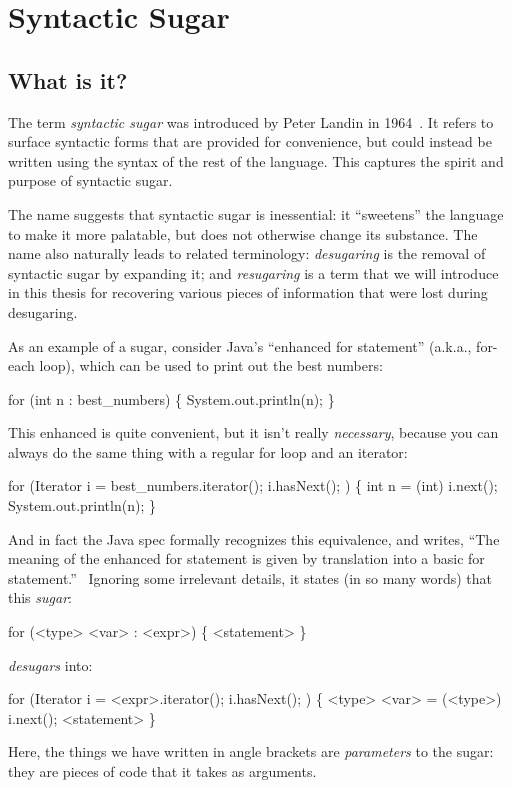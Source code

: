 \chapter{Syntactic Sugar}

\section{What is it?}

The term \emph{syntactic sugar} was introduced by Peter Landin in
1964~\cite{syntactic-sugar}. It refers to surface syntactic forms that are provided for
convenience, but could instead be written using the syntax of the rest
of the language. This captures the spirit and purpose of syntactic
sugar.

The name suggests that syntactic sugar is inessential: it ``sweetens''
the language to make it more palatable, but does not otherwise change
its substance. The name also naturally leads to related terminology:
\emph{desugaring} is the removal of syntactic sugar by expanding it;
and \emph{resugaring} is a term that we will introduce in this thesis
for recovering various pieces of information that were lost during
desugaring.

As an example of a sugar, consider Java's ``enhanced for statement''
(a.k.a., for-each loop), which can be used to print out the best
numbers:
\begin{Codes}
for (int n : best_numbers) \{
  System.out.println(n);
\}
\end{Codes}
This enhanced  is quite convenient, but it isn't really
\emph{necessary}, because you can always do the same thing with a
regular for loop and an iterator:
\begin{Codes}
for (Iterator i = best_numbers.iterator(); i.hasNext(); ) \{
  int n = (int) i.next();
  System.out.println(n);
\}
\end{Codes}

And in fact the Java spec formally recognizes this equivalence, and
writes, ``The meaning of the enhanced for statement is given by
translation into a basic for statement.''~\cite[section 14.14.2]{java8} Ignoring some
irrelevant details, it states (in so many words) that this \emph{sugar}:
\begin{Codes}
for (<type> <var> : <expr>) \{ <statement> \}
\end{Codes}
\emph{desugars} into:
\begin{Codes}
for (Iterator i = <expr>.iterator(); i.hasNext(); ) \{
  <type> <var> = (<type>) i.next();
  <statement>
\}
\end{Codes}
Here, the things we have written in angle brackets are
\emph{parameters} to the sugar: they are pieces of code that it
takes as arguments.

